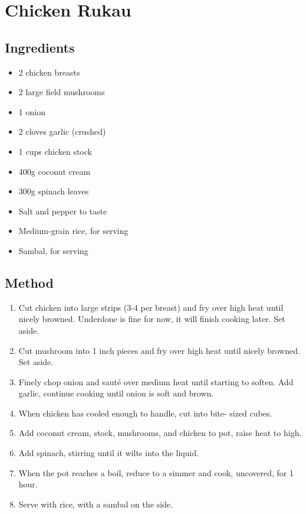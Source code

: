 \section{Chicken Rukau}

  
\subsection{Ingredients}

\begin{itemize}
    \item 2 chicken breasts
    \item 2 large field mushrooms
    \item 1 onion
    \item 2 cloves garlic (crushed)
    \item 1 cups chicken stock
    \item 400g coconut cream
    \item 300g spinach leaves
    \item Salt and pepper to taste
    \item Medium-grain rice, for serving
    \item Sambal, for serving
\end{itemize}

\subsection{Method}

\begin{enumerate}
    \item Cut chicken into large strips (3-4 per breast) and fry over
    high heat until nicely browned. Underdone is fine for now, it
    will finish cooking later. Set aside.
    \item Cut mushroom into 1 inch pieces and fry over high heat until
    nicely browned. Set aside.
    \item Finely chop onion and sauté over medium heat until starting
    to soften. Add garlic, continue cooking until onion is soft and
    brown.
    \item When chicken has cooled enough to handle, cut into bite-
    sized cubes.
    \item Add coconut cream, stock, mushrooms, and chicken to pot,
    raise heat to high.
    \item Add spinach, stirring until it wilts into the liquid.
    \item When the pot reaches a boil, reduce to a simmer and cook,
    uncovered, for 1 hour.
    \item Serve with rice, with a sambal on the side.
\end{enumerate}
